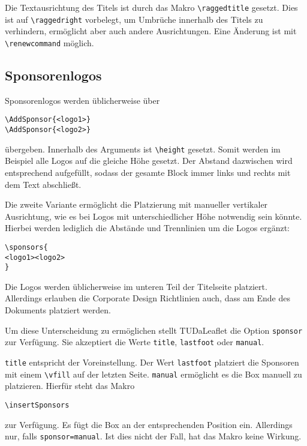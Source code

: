 \documentclass[
	german,%
	accentcolor=9c,%
]{tudaleaflet}
\begin{document}
Die Textausrichtung des Titels ist durch das Makro \verb+\raggedtitle+ gesetzt. Dies ist auf \verb+\raggedright+ vorbelegt, um Umbrüche innerhalb des Titels zu verhindern, ermöglicht aber auch andere Ausrichtungen. Eine Änderung ist mit \verb+\renewcommand+ möglich.

\subsection{Sponsorenlogos}
Sponsorenlogos werden üblicherweise über
\begin{verbatim}
\AddSponsor{<logo1>}
\AddSponsor{<logo2>}
\end{verbatim}
übergeben. Innerhalb des Arguments ist \verb+\height+ gesetzt. Somit werden im Beispiel alle Logos auf die gleiche Höhe gesetzt. Der Abstand dazwischen wird entsprechend aufgefüllt, sodass der gesamte Block immer links und rechts mit dem Text abschließt.

Die zweite Variante ermöglicht die Platzierung mit manueller vertikaler Ausrichtung, wie es bei Logos mit unterschiedlicher Höhe notwendig sein könnte. Hierbei werden lediglich die Abstände und Trennlinien um die Logos ergänzt:

\begin{verbatim}
\sponsors{
<logo1><logo2>
}
\end{verbatim}


Die Logos werden üblicherweise im unteren Teil der Titelseite platziert. Allerdings erlauben die Corporate Design Richtlinien auch, dass am Ende des Dokuments platziert werden.

Um diese Unterscheidung zu ermöglichen stellt TUDaLeaflet die Option \verb+sponsor+ zur Verfügung. Sie akzeptiert die Werte \verb+title+, \verb+lastfoot+ oder \verb+manual+.

\verb+title+ entspricht der Voreinstellung. Der Wert \verb+lastfoot+ platziert die Sponsoren mit einem \verb+\vfill+ auf der letzten Seite. \verb+manual+ ermöglicht es die Box manuell zu platzieren. Hierfür steht das Makro
\begin{verbatim}
\insertSponsors
\end{verbatim}
zur Verfügung. Es fügt die Box an der entsprechenden Position ein. Allerdings nur, falls \verb+sponsor=manual+. Ist dies nicht der Fall, hat das Makro keine Wirkung.


\printbibliography
\end{document}
